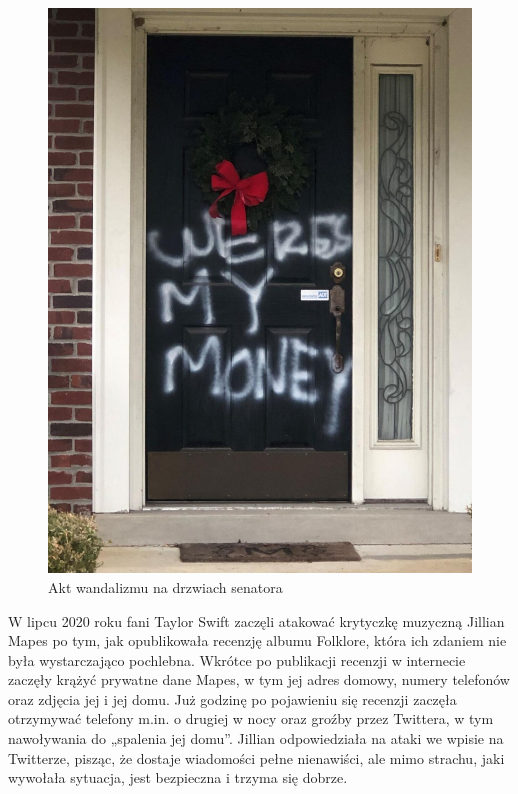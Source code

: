 \begin{figure}
  \centering
  \includegraphics[width=1\textwidth]{images/vandalism.jpg}
  \caption{Akt wandalizmu na drzwiach senatora}
  \label{fig:vandalism}
\end{figure} 

W lipcu 2020 roku fani Taylor Swift zaczęli atakować krytyczkę muzyczną Jillian Mapes po tym, jak opublikowała recenzję albumu Folklore, która ich zdaniem nie była wystarczająco pochlebna. Wkrótce po publikacji recenzji w internecie zaczęły krążyć prywatne dane Mapes, w tym jej adres domowy, numery telefonów oraz zdjęcia jej i jej domu.
Już godzinę po pojawieniu się recenzji zaczęła otrzymywać telefony m.in. o drugiej w nocy oraz groźby przez Twittera, w tym nawoływania do „spalenia jej domu”.
Jillian odpowiedziała na ataki we wpisie na Twitterze, pisząc, że dostaje wiadomości pełne nienawiści, ale mimo strachu, jaki wywołała sytuacja, jest bezpieczna i trzyma się dobrze.

